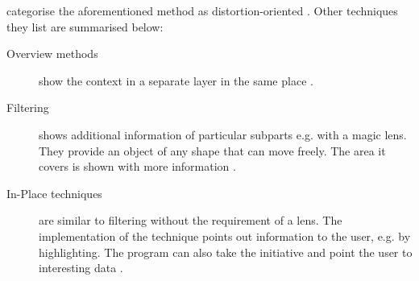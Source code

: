 \citeauthor{Kosara2003} categorise the aforementioned method as distortion-oriented . Other techniques they list are summarised below:
\newpage
\begin{description}
\item[Overview methods] show the context in a separate layer in the same place .
\item[Filtering] shows additional information of particular subparts e.g. with a magic lens. They provide an object of any shape that can move freely. The area it covers is shown with more information .
\item[In-Place techniques] are similar to filtering without the requirement of a lens. The implementation of the technique points out information to the user, e.g. by highlighting. The program can also take the initiative and point the user to interesting data .
\end{description}

